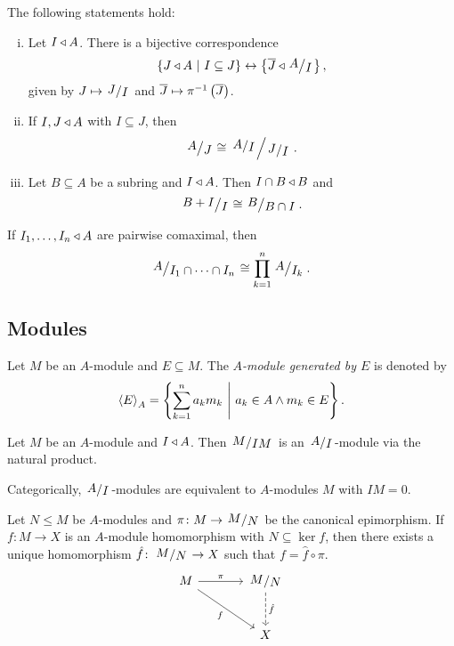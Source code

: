\begin{izrek}
The following statements hold:

\begin{enumerate}[i)]
\item Let $I \triangleleft A$. There is a bijective correspondence
\[
\setb{J \edn A}{I \subseteq J} \leftrightarrow
\set{\oline{J} \edn \kvoc{A}{I}},
\]
given by $J \mapsto \kvoc{J}{I}$ and
$\overline{J} \mapsto \pi^{-1} \left(\overline{J}\right)$.
\item If $I, J \triangleleft A$ with $I \subseteq J$, then
\[
\kvoc{A}{J} \cong \kvoc{\kvoc{A}{I}}{\kvoc{J}{I}}.
\]
\item Let $B \subseteq A$ be a subring and $I \triangleleft A$. Then
$I \cap B \triangleleft B$ and
\[
\kvoc{B+I}{I} \cong \kvoc{B}{B \cap I}.
\]
\end{enumerate}
\end{izrek}


\begin{izrek}
If $I_1, \dots, I_n \triangleleft A$ are pairwise comaximal, then
\[
\kvoc{A}{I_1 \cap \dots \cap I_n} \cong
\prod_{k=1}^n \kvoc{A}{I_k}.
\]
\end{izrek}

\newpage

\subsection{Modules}

\begin{definicija}
Let $M$ be an $A$-module and $E \subseteq M$. The
\emph{$A$-module generated by $E$} is denoted by
\[
\left\langle E\right\rangle_A = \left\{\sum_{k=1}^n a_k m_k~\middle\vert~a_k \in A \land m_k \in E\right\}.
\]
\end{definicija}

\begin{trditev}
Let $M$ be an $A$-module and $I \triangleleft A$. Then
$\kvoc{M}{IM}$ is an $\kvoc{A}{I}$-module via the natural product.
\end{trditev}

\begin{opomba}
Categorically, $\kvoc{A}{I}$-modules are equivalent to $A$-modules
$M$ with $IM = 0$.
\end{opomba}

\begin{izrek}
Let $N \leq M$ be $A$-modules and $\pi \colon M \to \kvoc{M}{N}$ be
the canonical epimorphism. If $f \colon M \to X$ is an $A$-module
homomorphism with $N \subseteq \ker f$, then there exists a unique
homomorphism $\hat{f} \colon \kvoc{M}{N} \to X$ such that
$f = \hat{f} \circ \pi$.
\[
\begin{tikzcd}[row sep=large, column sep=large]
M \arrow[r, "\pi"] \arrow[rd, "f"'] &
\kvoc{M}{N} \arrow[d, dashed, "\hat{f}"] \\ &
X
\end{tikzcd}
\]
\end{izrek}

